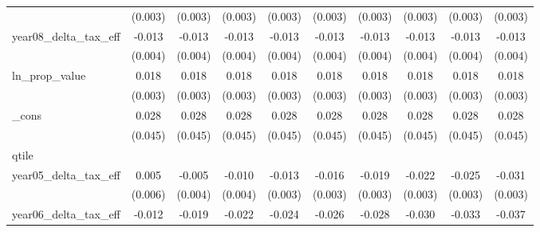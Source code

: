 {\begin{tabular}{l*{9}{c}}
            &     (0.003)         &     (0.003)         &     (0.003)         &     (0.003)         &     (0.003)         &     (0.003)         &     (0.003)         &     (0.003)         &     (0.003)         \\
[1em]
year08_delta_tax_eff&      -0.013\sym{***}&      -0.013\sym{***}&      -0.013\sym{***}&      -0.013\sym{***}&      -0.013\sym{***}&      -0.013\sym{***}&      -0.013\sym{***}&      -0.013\sym{***}&      -0.013\sym{***}\\
            &     (0.004)         &     (0.004)         &     (0.004)         &     (0.004)         &     (0.004)         &     (0.004)         &     (0.004)         &     (0.004)         &     (0.004)         \\
[1em]
ln_prop_value&       0.018\sym{***}&       0.018\sym{***}&       0.018\sym{***}&       0.018\sym{***}&       0.018\sym{***}&       0.018\sym{***}&       0.018\sym{***}&       0.018\sym{***}&       0.018\sym{***}\\
            &     (0.003)         &     (0.003)         &     (0.003)         &     (0.003)         &     (0.003)         &     (0.003)         &     (0.003)         &     (0.003)         &     (0.003)         \\
[1em]
_cons       &       0.028         &       0.028         &       0.028         &       0.028         &       0.028         &       0.028         &       0.028         &       0.028         &       0.028         \\
            &     (0.045)         &     (0.045)         &     (0.045)         &     (0.045)         &     (0.045)         &     (0.045)         &     (0.045)         &     (0.045)         &     (0.045)         \\
\hline
qtile       &                     &                     &                     &                     &                     &                     &                     &                     &                     \\
year05_delta_tax_eff&       0.005         &      -0.005         &      -0.010\sym{***}&      -0.013\sym{***}&      -0.016\sym{***}&      -0.019\sym{***}&      -0.022\sym{***}&      -0.025\sym{***}&      -0.031\sym{***}\\
            &     (0.006)         &     (0.004)         &     (0.004)         &     (0.003)         &     (0.003)         &     (0.003)         &     (0.003)         &     (0.003)         &     (0.003)         \\
[1em]
year06_delta_tax_eff&      -0.012\sym{*}  &      -0.019\sym{***}&      -0.022\sym{***}&      -0.024\sym{***}&      -0.026\sym{***}&      -0.028\sym{***}&      -0.030\sym{***}&      -0.033\sym{***}&      -0.037\sym{***}\\

\end{tabular}}

